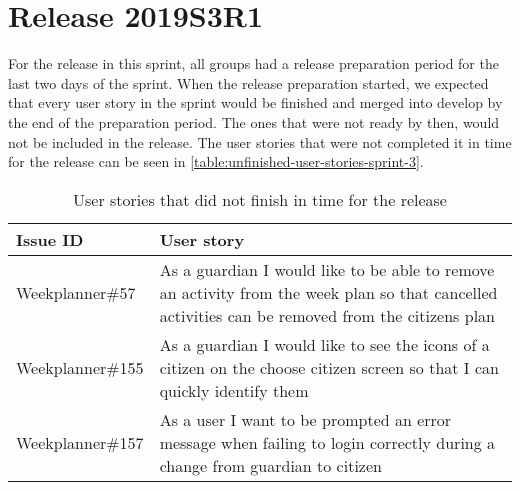 \section{Release 2019S3R1}
For the release in this sprint, all groups had a release preparation period for the last two days of the sprint. 
When the release preparation started, we expected that every user story in the sprint would be finished and merged into develop by the end of the preparation period. 
The ones that were not ready by then, would not be included in the release.
The user stories that were not completed it in time for the release can be seen in \autoref{table:unfinished-user-stories-sprint-3}.

\begin{table}[H]
    \small
    \begin{tabular}{|p{3.5cm}|p{9cm}|}
    \hline
    Issue ID        & User story   \\ \hline
    Weekplanner\#57  & As a guardian I would like to be able to remove an activity from the week plan so that cancelled activities can be removed from the citizens plan \\ \hline
    Weekplanner\#155 & As a guardian I would like to see the icons of a citizen on the choose citizen screen so that I can quickly identify them \\ \hline
    Weekplanner\#157 & As a user I want to be prompted an error message when failing to login correctly during a change from guardian to citizen \\ \hline
    \end{tabular}
    \caption{User stories that did not finish in time for the release}\label{table:unfinished-user-stories-sprint-3}
\end{table}

